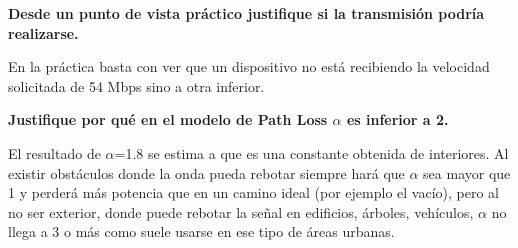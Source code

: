 \documentclass{article}
\begin{document}
\quad

\textbf{Desde un punto de vista práctico justifique si la transmisión podría realizarse.}

En la práctica basta con ver que un dispositivo no está recibiendo la velocidad solicitada de 54 Mbps sino a otra inferior.

\quad

\textbf{Justifique por qué en el modelo de Path Loss $\alpha$ es inferior a 2.}

El resultado de $\alpha$=1.8 se estima a que es una constante obtenida de interiores. Al existir obstáculos donde la onda pueda rebotar siempre hará que $\alpha$ sea mayor que 1 y perderá más potencia que en un camino ideal (por ejemplo el vacío), pero al no ser exterior, donde puede rebotar la señal en edificios, árboles, vehículos, $\alpha$ no llega a 3 o más como suele usarse en ese tipo de áreas urbanas.
\end{document}
